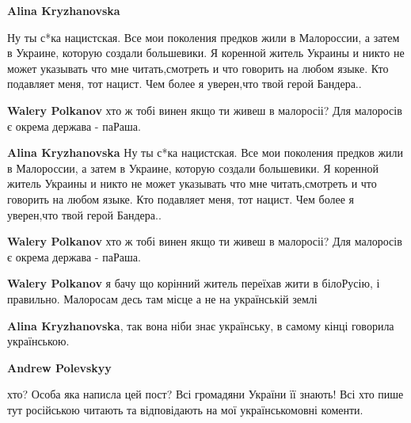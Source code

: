 \begin{itemize}
\begin{itemize}
\textbf{Alina Kryzhanovska} 

Ну ты с*ка нацистская. Все мои поколения предков
жили в Малороссии, а затем в Украине, которую создали большевики. Я коренной
житель Украины и никто не может указывать что мне читать,смотреть и что
говорить на любом языке. Кто подавляет меня, тот нацист. Чем более я уверен,что
твой герой Бандера..


\textbf{Walery Polkanov} хто ж тобі винен якщо ти живеш в малоросіі? Для
малоросів є окрема держава - паРаша.


\textbf{Alina Kryzhanovska} Ну ты с*ка нацистская. Все мои поколения предков жили в Малороссии, а затем в Украине, которую создали большевики. Я коренной житель Украины и никто не может указывать что мне читать,смотреть и что говорить на любом языке. Кто подавляет меня, тот нацист. Чем более я уверен,что твой герой Бандера..


\textbf{Walery Polkanov} хто ж тобі винен якщо ти живеш в малоросіі? Для малоросів є окрема держава - паРаша.


\textbf{Walery Polkanov} я бачу що корінний житель переїхав жити в білоРусію, і
правильно. Малоросам десь там місце а не на українській землі


\textbf{Alina Kryzhanovska}, так вона ніби знає українську, в самому кінці
говорила українською.


\textbf{Andrew Polevskyy} 

хто? Особа яка написла цей пост? Всі громадяни України її знають! Всі хто пише
тут російською читають та відповідають на мої українськомовні коменти.


\end{itemize}
\end{itemize}
